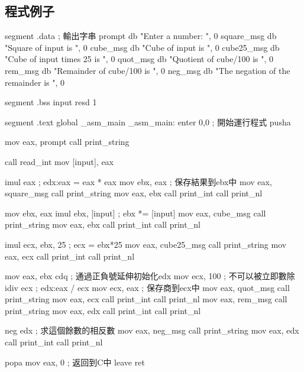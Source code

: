 \subsection{程式例子}
\begin{AsmCodeListing}[label=math.asm]
segment .data         ; 輸出字串
prompt          db    "Enter a number: ", 0
square_msg      db    "Square of input is ", 0
cube_msg        db    "Cube of input is ", 0
cube25_msg      db    "Cube of input times 25 is ", 0
quot_msg        db    "Quotient of cube/100 is ", 0
rem_msg         db    "Remainder of cube/100 is ", 0
neg_msg         db    "The negation of the remainder is ", 0

segment .bss
input   resd 1

segment .text
        global  _asm_main
_asm_main:
        enter   0,0               ; 開始運行程式
    pusha

        mov     eax, prompt
        call    print_string

        call    read_int
        mov     [input], eax

        imul    eax               ; edx:eax = eax * eax
        mov     ebx, eax          ; 保存結果到ebx中
        mov     eax, square_msg
        call    print_string
        mov     eax, ebx
        call    print_int
        call    print_nl

        mov     ebx, eax
        imul    ebx, [input]      ; ebx *= [input]
        mov     eax, cube_msg
        call    print_string
        mov     eax, ebx
        call    print_int
        call    print_nl

        imul    ecx, ebx, 25      ; ecx = ebx*25
        mov     eax, cube25_msg
        call    print_string
        mov     eax, ecx
        call    print_int
        call    print_nl

        mov     eax, ebx
        cdq                       ; 通過正負號延伸初始化edx
        mov     ecx, 100          ; 不可以被立即數除
        idiv    ecx               ; edx:eax / ecx
        mov     ecx, eax          ; 保存商到ecx中
        mov     eax, quot_msg
        call    print_string
        mov     eax, ecx
        call    print_int
        call    print_nl
        mov     eax, rem_msg
        call    print_string
        mov     eax, edx
        call    print_int
        call    print_nl

        neg     edx               ; 求這個餘數的相反數
        mov     eax, neg_msg
        call    print_string
        mov     eax, edx
        call    print_int
        call    print_nl

        popa
        mov     eax, 0            ; 返回到C中
        leave
        ret
\end{AsmCodeListing}

